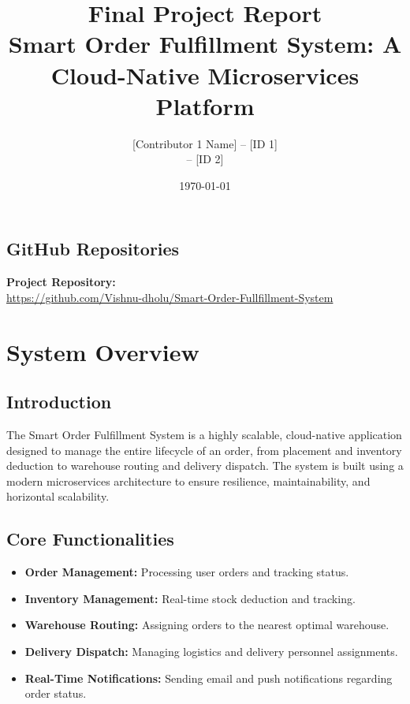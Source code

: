 \documentclass[12pt,a4paper]{report}
\title{
    \Huge \textbf{Final Project Report} \\
    \vspace{1cm}
    \Large Smart Order Fulfillment System: A Cloud-Native Microservices Platform
}
\author{
    [Contributor 1 Name] -- [ID 1] \\
    [Contributor 2 Name] -- [ID 2]
}
\date{\today}
\begin{document}
\maketitle

\section*{GitHub Repositories}

\textbf{Project Repository:} \\
\url{https://github.com/Vishnu-dholu/Smart-Order-Fullfillment-System}

\tableofcontents
\newpage

\chapter{System Overview}

\section{Introduction}
The Smart Order Fulfillment System is a highly scalable, cloud-native application designed to manage the entire lifecycle of an order, from placement and inventory deduction to warehouse routing and delivery dispatch. The system is built using a modern microservices architecture to ensure resilience, maintainability, and horizontal scalability.

\section{Core Functionalities}
\begin{itemize}
    \item \textbf{Order Management:} Processing user orders and tracking status.
    \item \textbf{Inventory Management:} Real-time stock deduction and tracking.
    \item \textbf{Warehouse Routing:} Assigning orders to the nearest optimal warehouse.
    \item \textbf{Delivery Dispatch:} Managing logistics and delivery personnel assignments.
    \item \textbf{Real-Time Notifications:} Sending email and push notifications regarding order status.
\end{itemize}
\end{document}
